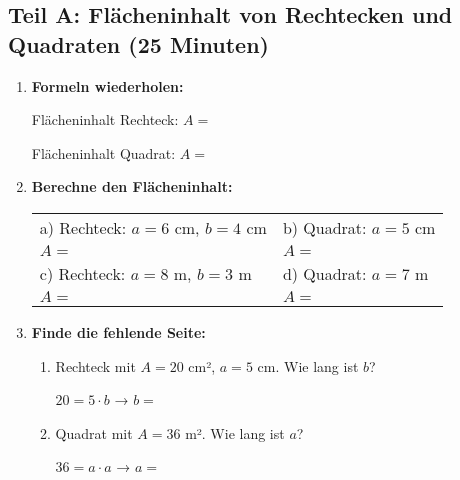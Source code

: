 \subsection*{Teil A: Flächeninhalt von Rechtecken und Quadraten (25 Minuten)}

\begin{enumerate}[label=\arabic*.]
    \item \textbf{Formeln wiederholen:}
    \vspace{0.5cm}

    Flächeninhalt Rechteck: $A = $ \underline{\hspace{3cm}}

    Flächeninhalt Quadrat: $A = $ \underline{\hspace{3cm}}

    \vspace{1cm}

    \item \textbf{Berechne den Flächeninhalt:}
    \vspace{0.5cm}

    \begin{tabular}{ll}
        a) Rechteck: $a = 6$ cm, $b = 4$ cm & b) Quadrat: $a = 5$ cm \\[2ex]
        $A = $ \underline{\hspace{4cm}} & $A = $ \underline{\hspace{4cm}} \\[4ex]
        c) Rechteck: $a = 8$ m, $b = 3$ m & d) Quadrat: $a = 7$ m \\[2ex]
        $A = $ \underline{\hspace{4cm}} & $A = $ \underline{\hspace{4cm}}
    \end{tabular}

    \vspace{1cm}

    \item \textbf{Finde die fehlende Seite:}
    \vspace{0.5cm}

    \begin{enumerate}[label=\alph*)]
        \item Rechteck mit $A = 20$ cm², $a = 5$ cm. Wie lang ist $b$?

        $20 = 5 \cdot b$ → $b = $ \underline{\hspace{3cm}}

        \vspace{0.5cm}

        \item Quadrat mit $A = 36$ m². Wie lang ist $a$?

        $36 = a \cdot a$ → $a = $ \underline{\hspace{3cm}}
    \end{enumerate}

\end{enumerate}

